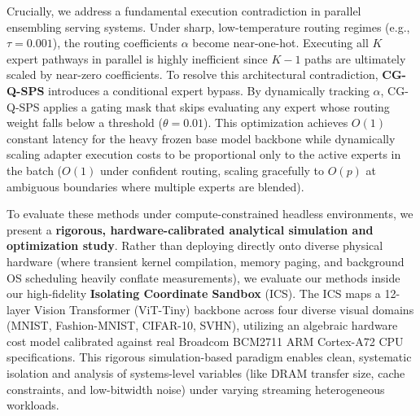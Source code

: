 Crucially, we address a fundamental execution contradiction in parallel ensembling serving systems. Under sharp, low-temperature routing regimes (e.g., $\tau = 0.001$), the routing coefficients $\alpha$ become near-one-hot. Executing all $K$ expert pathways in parallel is highly inefficient since $K-1$ paths are ultimately scaled by near-zero coefficients. To resolve this architectural contradiction, \textbf{CG-Q-SPS} introduces a conditional expert bypass. By dynamically tracking $\alpha$, CG-Q-SPS applies a gating mask that skips evaluating any expert whose routing weight falls below a threshold ($\theta = 0.01$). This optimization achieves $O(1)$ constant latency for the heavy frozen base model backbone while dynamically scaling adapter execution costs to be proportional only to the active experts in the batch ($O(1)$ under confident routing, scaling gracefully to $O(p)$ at ambiguous boundaries where multiple experts are blended).

To evaluate these methods under compute-constrained headless environments, we present a \textbf{rigorous, hardware-calibrated analytical simulation and optimization study}. Rather than deploying directly onto diverse physical hardware (where transient kernel compilation, memory paging, and background OS scheduling heavily conflate measurements), we evaluate our methods inside our high-fidelity \textbf{Isolating Coordinate Sandbox} (ICS). The ICS maps a 12-layer Vision Transformer (ViT-Tiny) backbone across four diverse visual domains (MNIST, Fashion-MNIST, CIFAR-10, SVHN), utilizing an algebraic hardware cost model calibrated against real Broadcom BCM2711 ARM Cortex-A72 CPU specifications. This rigorous simulation-based paradigm enables clean, systematic isolation and analysis of systems-level variables (like DRAM transfer size, cache constraints, and low-bitwidth noise) under varying streaming heterogeneous workloads.

